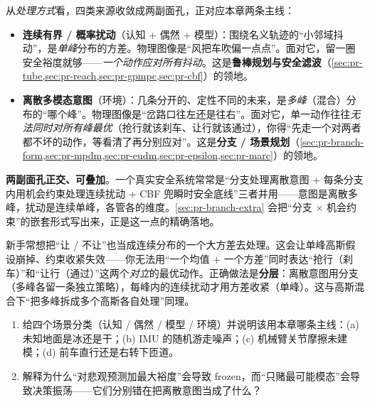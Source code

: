 从\emph{处理方式}看，四类来源收敛成两副面孔，正对应本章两条主线：

\begin{itemize}
  \item \textbf{连续有界 / 概率扰动}（认知 + 偶然 + 模型）：围绕名义轨迹的“小邻域抖动”，是\emph{单峰}分布的方差。物理图像是“风把车吹偏一点点”。面对它，留一圈安全裕度就够——\emph{一个动作应对所有抖动}。这是\textbf{鲁棒规划与安全滤波}（\cref{sec:pr-tube,sec:pr-reach,sec:pr-gpmpc,sec:pr-cbf}）的领地。
  \item \textbf{离散多模态意图}（环境）：几条分开的、定性不同的未来，是\emph{多峰}（混合）分布的“哪个峰”。物理图像是“岔路口往左还是往右”。面对它，单一动作往往\emph{无法同时对所有峰最优}（抢行就该刹车、让行就该通过），你得“先走一个对两者都不坏的动作，等看清了再分别应对”。这是\textbf{分支 / 场景规划}（\cref{sec:pr-branch-form,sec:pr-mpdm,sec:pr-eudm,sec:pr-epsilon,sec:pr-marc}）的领地。
\end{itemize}

\begin{insight}
\textbf{两副面孔正交、可叠加}。一个真实安全系统常常是“分支处理离散意图 + 每条分支内用机会约束处理连续扰动 + CBF 兜瞬时安全底线”三者并用——意图是离散多峰，扰动是连续单峰，各管各的维度。\cref{sec:pr-branch-extra} 会把“分支 $\times$ 机会约束”的嵌套形式写出来，正是这一点的精确落地。
\end{insight}

\begin{pitfall}
新手常想把“让 / 不让”也当成连续分布的一个大方差去处理。这会让单峰高斯假设崩掉、约束收紧失效——你无法用“一个均值 + 一个方差”同时表达“抢行（刹车）”和“让行（通过）”这两个\emph{对立}的最优动作。正确做法是\textbf{分层}：离散意图用分支（多峰各留一条独立策略），每峰内的连续扰动才用方差收紧（单峰）。这与高斯混合下“把多峰拆成多个高斯各自处理”同理。
\end{pitfall}

\begin{practice}
\begin{enumerate}
  \item 给四个场景分类（认知 / 偶然 / 模型 / 环境）并说明该用本章哪条主线：(a) 未知地面是冰还是干；(b) IMU 的随机游走噪声；(c) 机械臂关节摩擦未建模；(d) 前车直行还是右转下匝道。
  \item 解释为什么“对悲观预测加最大裕度”会导致 frozen，而“只赌最可能模态”会导致决策振荡——它们分别错在把离散意图当成了什么？
\end{enumerate}
\end{practice}

